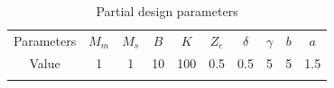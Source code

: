 \begin{table}[htp]%
    \centering
    \caption{Partial design parameters}
    \label{tab1}
    \begin{tabular}{ccccc ccccc}%
        \hline\hline\noalign{\smallskip}
        Parameters & $M_m$ & $M_s$ & $B$ & $K$ & $Z_e$ & $\delta$ & $\gamma$ & $b$ & $a$ \\
        \noalign{\smallskip}\hline\noalign{\smallskip}
        Value      & 1     & 1     & 10  & 100 & 0.5   & 0.5      & 5        & 5   & 1.5 \\
        \noalign{\smallskip}\hline
    \end{tabular}
\end{table}




